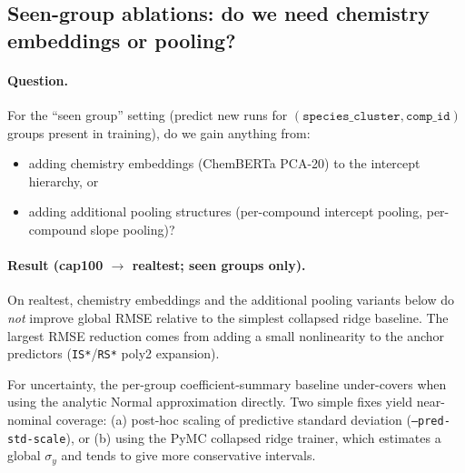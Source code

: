 \documentclass[11pt]{article}
\begin{document}
\subsection{Seen-group ablations: do we need chemistry embeddings or pooling?}

\paragraph{Question.}
For the ``seen group'' setting (predict new runs for $(\texttt{species\_cluster}, \texttt{comp\_id})$ groups present in training),
do we gain anything from:
\begin{itemize}
  \item adding chemistry embeddings (ChemBERTa PCA-20) to the intercept hierarchy, or
  \item adding additional pooling structures (per-compound intercept pooling, per-compound slope pooling)?
\end{itemize}

\paragraph{Result (cap100 $\rightarrow$ realtest; seen groups only).}
On realtest, chemistry embeddings and the additional pooling variants below do \emph{not} improve global RMSE relative to the simplest
collapsed ridge baseline. The largest RMSE reduction comes from adding a small nonlinearity to the anchor predictors
(\texttt{IS*}/\texttt{RS*} poly2 expansion).

For uncertainty, the per-group coefficient-summary baseline under-covers when using the analytic Normal approximation directly.
Two simple fixes yield near-nominal coverage:
(a) post-hoc scaling of predictive standard deviation (\texttt{--pred-std-scale}), or
(b) using the PyMC collapsed ridge trainer, which estimates a global $\sigma_y$ and tends to give more conservative intervals.
\end{document}
